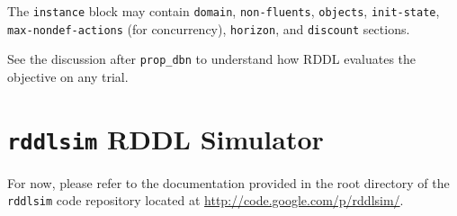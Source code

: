 \documentclass[11pt,a4paper]{article}
\begin{document}
The \texttt{instance} block may contain 
\texttt{domain}, \texttt{non-fluents}, \texttt{objects}, 
\texttt{init-state},\\ \texttt{max-nondef-actions} (for concurrency), 
\texttt{horizon}, and \texttt{discount} sections.

See the discussion after \texttt{prop\_dbn} to understand how RDDL
evaluates the objective on any trial.

\section{\texttt{rddlsim} RDDL Simulator}

For now, please refer to the documentation provided in the
root directory of the \texttt{rddlsim} code repository
located at \url{http://code.google.com/p/rddlsim/}.

 


\COMMENT

\ENDCOMMENT
\end{document}
